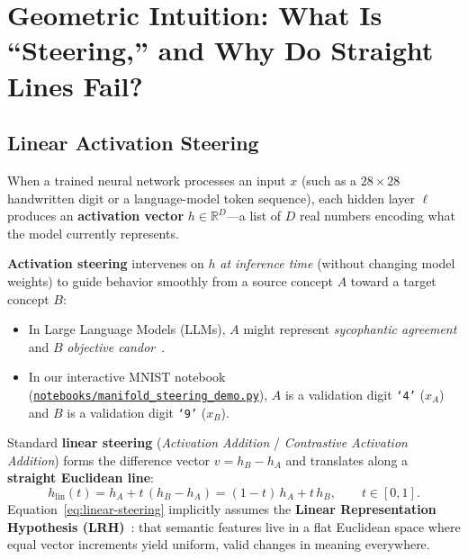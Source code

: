 \documentclass[11pt,a4paper]{article}
\newcommand{\R}{\mathbb{R}}
\theoremstyle{definition}
\begin{document}
\section{Geometric Intuition: What Is ``Steering,'' and Why Do Straight Lines Fail?}
\label{sec:motivation}

\subsection{Linear Activation Steering}

When a trained neural network processes an input $x$ (such as a $28 \times 28$ handwritten digit or a language-model token sequence), each hidden layer $\ell$ produces an \textbf{activation vector} $h \in \R^D$---a list of $D$ real numbers encoding what the model currently represents.

\textbf{Activation steering} intervenes on $h$ \emph{at inference time} (without changing model weights) to guide behavior smoothly from a source concept $A$ toward a target concept $B$:
\begin{itemize}[leftmargin=*]
    \item In Large Language Models (LLMs), $A$ might represent \emph{sycophantic agreement} and $B$ \emph{objective candor}~\cite{turner2023actadd,zou2023repe,rimsky2024caa}.
    \item In our interactive MNIST notebook (\href{run:../notebooks/manifold_steering_demo.py}{\texttt{notebooks/manifold\_steering\_demo.py}}), $A$ is a validation digit \texttt{`4'} ($x_A$) and $B$ is a validation digit \texttt{`9'} ($x_B$).
\end{itemize}

Standard \textbf{linear steering} (\emph{Activation Addition} / \emph{Contrastive Activation Addition}) forms the difference vector $v = h_B - h_A$ and translates along a \textbf{straight Euclidean line}:
\begin{equation}
    h_{\mathrm{lin}}(t) = h_A + t\,(h_B - h_A) = (1 - t)\,h_A + t\,h_B, \qquad t \in [0, 1].
    \label{eq:linear-steering}
\end{equation}
Equation~\eqref{eq:linear-steering} implicitly assumes the \textbf{Linear Representation Hypothesis (LRH)}~\cite{park2024linear}: that semantic features live in a flat Euclidean space where equal vector increments yield uniform, valid changes in meaning everywhere.
\end{document}
